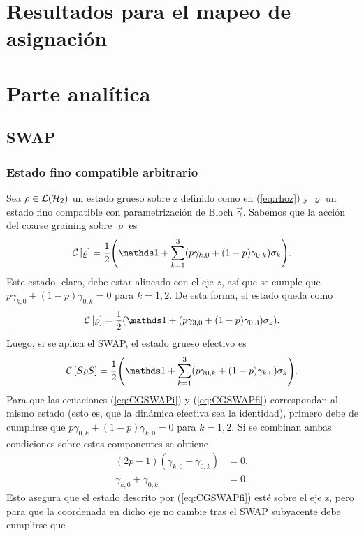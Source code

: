 \section{Resultados para el mapeo de asignación}



\section{Parte analítica}


\subsection{SWAP}
\subsubsection{Estado fino compatible arbitrario}
Sea $\rho\in\mathcal{L}(\mathcal{H}_{2})$ un estado grueso sobre z definido como en (\ref{eq:rhoz}) y $\varrho$ un estado fino compatible con parametrización de Bloch $\vec{\gamma}$. Sabemos que la acción del coarse graining sobre $\varrho$ es
\begin{equation}\label{eq:CGSWAPprei}
\CG{\varrho}=\frac{1}{2}\qty(\Id+\sum_{k=1}^{3}(p\gamma_{k,0}+(1-p)\gamma_{0,k})\sigma_{k}).
\end{equation}
Este estado, claro, debe estar alineado con el eje $z$, así que se cumple que $p\gamma_{k,0}+(1-p)\gamma_{0,k}=0$ para $k=1,2$. De esta forma, el estado queda como
\begin{equation}\label{eq:CGSWAPi}
\CG{\varrho}=\frac{1}{2}\qty(\Id+(p\gamma_{3,0}+(1-p)\gamma_{0,3})\sigma_{z}).
\end{equation}
Luego, si se aplica el SWAP, el estado grueso efectivo es
\begin{equation}\label{eq:CGSWAPfi}
\CG{S\varrho S}=\frac{1}{2}\qty(\Id+\sum_{k=1}^{3}(p\gamma_{0,k}+(1-p)\gamma_{k,0})\sigma_{k}).
\end{equation}
Para que las ecuaciones (\ref{eq:CGSWAPi}) y (\ref{eq:CGSWAPfi}) correspondan al mismo estado (esto es, que la dinámica efectiva sea la identidad), primero debe de cumplirse que $p\gamma_{0,k}+(1-p)\gamma_{k,0}=0$ para $k=1,2$. Si se combinan ambas condiciones sobre estas componentes se obtiene
\begin{align*}
(2p-1)(\gamma_{k,0}-\gamma_{0,k})&=0,\\
\gamma_{k,0}+\gamma_{0,k}&=0.
\end{align*}
Esto asegura que el estado descrito por (\ref{eq:CGSWAPfi}) esté sobre el eje z, pero para que la coordenada en dicho eje no cambie tras el SWAP subyacente debe cumplirse que 
